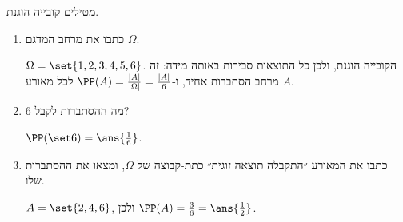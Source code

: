 מטילים קובייה הוגנת.
\begin{enumerate}
\item כתבו את מרחב המדגם $\Omega$.
\begin{solbox}
$\Omega=\set{1,2,3,4,5,6}$. הקובייה הוגנת, ולכן כל התוצאות סבירות באותה מידה: זה מרחב הסתברות אחיד, ו-$\PP(A)=\frac{|A|}{|\Omega|}=\frac{|A|}6$ לכל מאורע $A$.
\end{solbox}
\item מה ההסתברות לקבל 6?
\begin{solbox}
$\PP(\set6)=\ans{\frac16}$.
\end{solbox}
\item כתבו את המאורע ״התקבלה תוצאה זוגית״ כתת-קבוצה של $\Omega$, ומצאו את ההסתברות שלו.
\begin{solbox}
$A=\set{2,4,6}$, ולכן $\PP(A)=\frac36=\ans{\frac12}$.
\end{solbox}
\end{enumerate}
